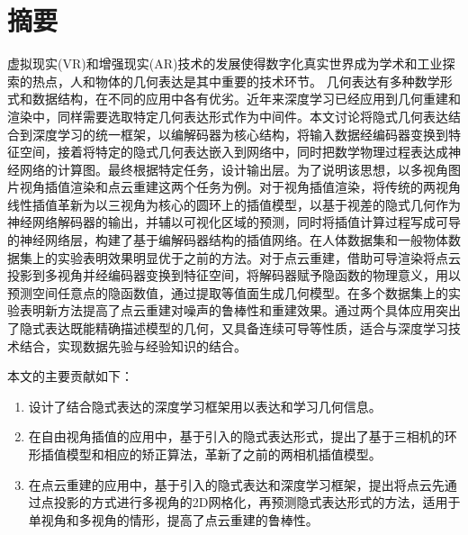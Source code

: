 \maketitle%
\MAKETITLE%
\makedeclaration%
\intobmk\chapter*{摘\quad 要}%
\setcounter{page}{1}%

虚拟现实(VR)和增强现实(AR)技术的发展使得数字化真实世界成为学术和工业探索的热点，人和物体的几何表达是其中重要的技术环节。 几何表达有多种数学形式和数据结构，在不同的应用中各有优劣。近年来深度学习已经应用到几何重建和渲染中，同样需要选取特定几何表达形式作为中间件。本文讨论将隐式几何表达结合到深度学习的统一框架，以编解码器为核心结构，将输入数据经编码器变换到特征空间，接着将特定的隐式几何表达嵌入到网络中，同时把数学物理过程表达成神经网络的计算图。最终根据特定任务，设计输出层。为了说明该思想，以多视角图片视角插值渲染和点云重建这两个任务为例。对于视角插值渲染，将传统的两视角线性插值革新为以三视角为核心的圆环上的插值模型，以基于视差的隐式几何作为神经网络解码器的输出，并辅以可视化区域的预测，同时将插值计算过程写成可导的神经网络层，构建了基于编解码器结构的插值网络。在人体数据集和一般物体数据集上的实验表明效果明显优于之前的方法。对于点云重建，借助可导渲染将点云投影到多视角并经编码器变换到特征空间，将解码器赋予隐函数的物理意义，用以预测空间任意点的隐函数值，通过提取等值面生成几何模型。在多个数据集上的实验表明新方法提高了点云重建对噪声的鲁棒性和重建效果。通过两个具体应用突出了隐式表达既能精确描述模型的几何，又具备连续可导等性质，适合与深度学习技术结合，实现数据先验与经验知识的结合。

本文的主要贡献如下：
\begin{enumerate}
\item 设计了结合隐式表达的深度学习框架用以表达和学习几何信息。
\item 在自由视角插值的应用中，基于引入的隐式表达形式，提出了基于三相机的环形插值模型和相应的矫正算法，革新了之前的两相机插值模型。
\item 在点云重建的应用中，基于引入的隐式表达和深度学习框架，提出将点云先通过点投影的方式进行多视角的2D网格化，再预测隐式表达形式的方法，适用于单视角和多视角的情形，提高了点云重建的鲁棒性。
\end{enumerate}




